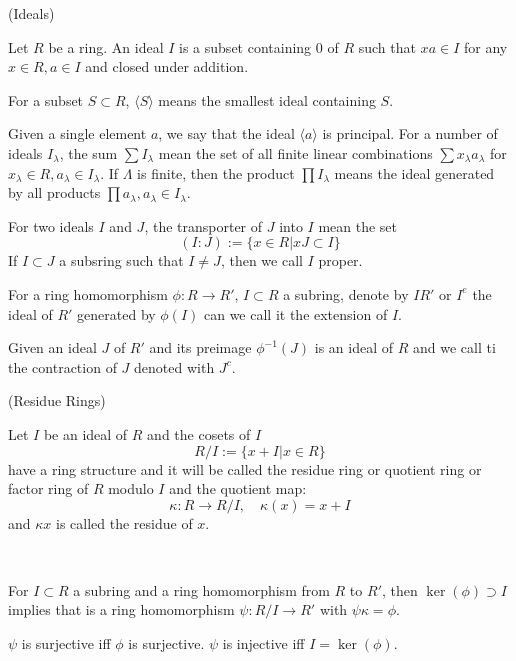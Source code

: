\documentclass{article}
\begin{document}
\begin{definition}
    (Ideals)\par
    Let $R$ be a ring. An ideal $I$ is a subset containing $0$ of $R$ such that $xa\in I$ for any $x\in R, a\in I$ and closed under addition.\par
    For a subset $S\subset R$, $\langle S\rangle$ means the smallest ideal containing $S$.\par
    Given a single element $a$, we say that the ideal $\langle a \rangle$ is principal. For a number of ideals $I_\lambda$, the sum $\sum I_{\lambda}$ mean the set of all finite linear combinations $\sum x_{\lambda}a_{\lambda}$ for $x_{\lambda} \in R, a_{\lambda}\in I_{\lambda}$. If $\Lambda$ is finite, then the product $\prod I_{\lambda}$ means the ideal generated by all products $\prod a_{\lambda}, a_{\lambda}\in I_{\lambda}$.\par
    For two ideals $I$ and $J$, the transporter of $J$ into $I$ mean the set
    \[(I:J):=\{x\in R|xJ\subset I\}\]
    If $I\subset J$ a subsring such that $I\neq J$, then we call $I$ proper.\par
    For a ring homomorphism $\phi:R\to R'$, $I\subset R$ a subring, denote by $IR'$ or $I^e$ the ideal of $R'$ generated by $\phi(I)$ can we call it the extension of $I$.\par
    Given an ideal $J$ of $R'$ and its preimage $\phi^{-1}(J)$ is an ideal of $R$ and we call ti the contraction of $J$ denoted with $J^c$.
\end{definition}

\begin{definition}
    (Residue Rings)\par
    Let $I$ be an ideal of $R$ and the cosets of $I$
    \[R/I := \{x+I|x\in R\}\]
    have a ring structure and it will be called the residue ring or quotient ring or factor ring of $R$ modulo $I$ and the quotient map:
    \[
    \kappa: R \to R/I,\quad \kappa(x) = x+I
    \]
    and $\kappa x$ is called the residue of $x$.
\end{definition}

\begin{proposition}\ \par
    For $I\subset R$ a subring and a ring homomorphism from $R$ to $R'$, then $\ker(\phi) \supset I$ implies that is a ring homomorphism $\psi:R/I \to R'$ with $\psi\kappa = \phi$.\par
    $\psi$ is surjective iff $\phi$ is surjective. $\psi$ is injective iff $I = \ker(\phi)$.
\end{proposition}
\end{document}
